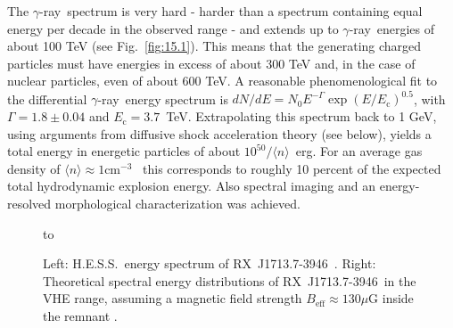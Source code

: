 \documentclass{svjour3x}                     %
\newcommand{\gr}{$\gamma$-ray}
\newcommand{\rxj}{RX~J1713.7-3946}
\newcommand{\hess}{H.E.S.S.}
\begin{document}
The \gr\ spectrum is very hard - harder than a spectrum containing equal energy
per decade in the observed range - and extends up to \gr\ energies of about 100
TeV \cite{aha07} (see Fig.~\ref{fig:15.1}). This means that the generating
charged particles must have energies in excess of about 300 TeV and, in the case of
nuclear particles, even of about 600 TeV. A reasonable phenomenological fit to the
differential \gr\ energy spectrum is $dN/dE = N_0 E^{-\Gamma}
\exp{(E/E_\mathrm{c})^{0.5}}$, with $\Gamma = 1.8 \pm 0.04$ and $E_\mathrm{c} =
3.7$~TeV. Extrapolating this spectrum back to 1 GeV, using arguments from
diffusive shock acceleration theory (see below), yields a total energy in
energetic particles of about $10^{50}/{\langle n \rangle}$~erg. For an average
gas density of $\langle n \rangle \approx 1 \mathrm{cm}^{-3}$~ this
corresponds to roughly 10 percent of the expected total hydrodynamic explosion
energy. Also spectral imaging and an energy-resolved morphological
characterization was achieved.
 
\begin{figure}
\hbox to 
  \caption[Spectrum of \rxj]{Left: \hess\ energy spectrum of \rxj\ \cite{aha07}.
   Right: Theoretical spectral energy distributions of \rxj\ in the VHE range,
   assuming a magnetic field strength $B_{\mathrm{eff}} \approx 130 \mu$G
   inside the remnant \cite{bv08}.}
  \label{fig:15.1}       %
  \label{fig:15.2}       %
\end{figure}
 
\end{document}
